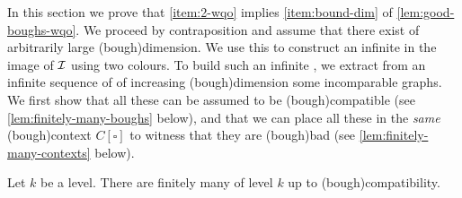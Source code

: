\AP In this section we prove that \cref{item:2-wqo} implies \cref{item:bound-dim}
of \cref{lem:good-boughs-wqo}. We proceed by contraposition and assume that
there exist  of arbitrarily large \kl(bough){dimension}. We use
this to construct an infinite  in the image of $\mathcal{I}$ using
two colours. To build such an infinite , we extract from an
infinite sequence of  of increasing \kl(bough){dimension} some
incomparable graphs. We first show that all these  can be assumed
to be \kl(bough){compatible} (see \cref{lem:finitely-many-boughs} below), and
that we can place all these  in the \emph{same} \kl(bough){context}
$C[\square]$ to witness that they are \kl(bough){bad} (see
\cref{lem:finitely-many-contexts} below).

\begin{lemma}[name={},restate=lem:finitely-many-boughs]
  \label{lem:finitely-many-boughs}
  Let $k$ be a level. There are finitely many  of level $k$ 
  up to \kl(bough){compatibility}.
\end{lemma}



